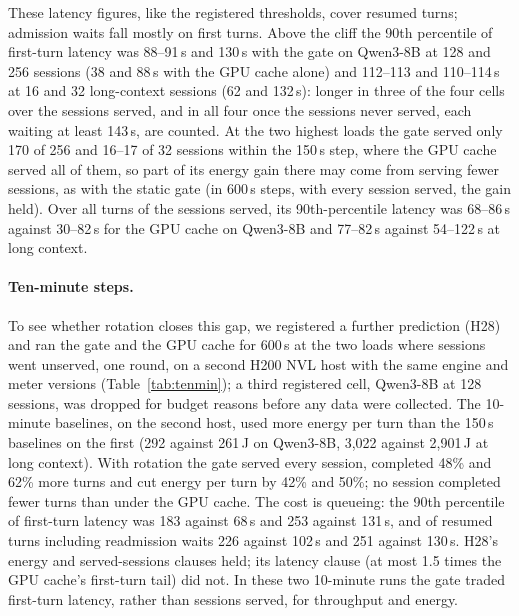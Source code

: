 These latency figures, like the registered thresholds, cover resumed turns; admission waits fall mostly on first
turns. Above the cliff the 90th percentile of first-turn latency was 88--91\,s and 130\,s with the gate on Qwen3-8B at
128 and 256 sessions (38 and 88\,s with the GPU cache alone) and 112--113 and 110--114\,s at 16 and 32 long-context sessions (62
and 132\,s): longer in three of the four cells over the sessions served, and in all four once the sessions never served,
each waiting at least 143\,s, are counted. At the two highest loads the gate served only 170 of 256 and 16--17 of 32 sessions within the 150\,s step,
where the GPU cache served all of them, so part of its energy gain there may come from serving fewer sessions, as with
the static gate (in 600\,s steps, with every session served, the gain held). Over all turns of the sessions served, its 90th-percentile latency was 68--86\,s against 30--82\,s
for the GPU cache on Qwen3-8B and 77--82\,s against 54--122\,s at long context. 
\paragraph{Ten-minute steps.} To see whether rotation closes this gap, we registered a further prediction (H28)
and ran the gate and the GPU cache for 600\,s at the two loads where sessions went unserved, one round, on a second
H200 NVL host with the same engine and meter versions (Table~\ref{tab:tenmin}); a third registered cell, Qwen3-8B at 128 sessions, was
dropped for budget reasons before any data were collected. The 10-minute baselines, on the second host, used more energy per turn than the 150\,s baselines on the first (292 against
261\,J on Qwen3-8B, 3,022 against 2,901\,J at long context). With rotation the gate served every session,
completed 48\% and 62\% more turns and cut energy per turn by 42\% and 50\%; no session completed fewer turns than
under the GPU cache. The cost is queueing: the 90th percentile of first-turn latency was 183 against 68\,s and 253
against 131\,s, and of resumed turns including readmission waits 226 against 102\,s and 251 against 130\,s. H28's
energy and served-sessions clauses held; its latency clause (at most 1.5 times the GPU cache's first-turn tail) did
not. In these two 10-minute runs the gate traded first-turn latency, rather than sessions served, for throughput and energy.


